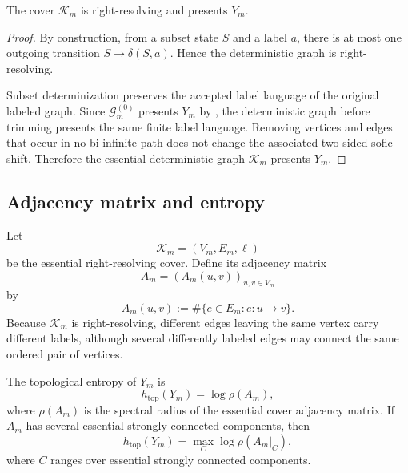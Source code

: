 \begin{proposition}
\label{prop:right-resolving-cover}
The cover \(\mathcal K_m\) is right-resolving and presents \(Y_m\).
\end{proposition}

\begin{proof}
By construction, from a subset state \(S\) and a label \(a\), there is at most one outgoing transition \(S\to\delta(S,a)\).  Hence the deterministic graph is right-resolving.

Subset determinization preserves the accepted label language of the original labeled graph.  Since \(\mathcal G_m^{(0)}\) presents \(Y_m\) by , the deterministic graph before trimming presents the same finite label language.  Removing vertices and edges that occur in no bi-infinite path does not change the associated two-sided sofic shift.  Therefore the essential deterministic graph \(\mathcal K_m\) presents \(Y_m\).
\end{proof}

\subsection{Adjacency matrix and entropy}

Let
\[
\mathcal K_m=(V_m,E_m,\ell)
\]
be the essential right-resolving cover.  Define its adjacency matrix
\[
A_m=(A_m(u,v))_{u,v\in V_m}
\]
by
\[
A_m(u,v):=\#\{e\in E_m:e:u\to v\}.
\]
Because \(\mathcal K_m\) is right-resolving, different edges leaving the same vertex carry different labels, although several differently labeled edges may connect the same ordered pair of vertices.

\begin{theorem}
\label{thm:cover-entropy}
The topological entropy of \(Y_m\) is
\[
h_{\mathrm{top}}(Y_m)=\log\rho(A_m),
\]
where \(\rho(A_m)\) is the spectral radius of the essential cover adjacency matrix.  If \(A_m\) has several essential strongly connected components, then
\[
h_{\mathrm{top}}(Y_m)=\max_C\log\rho(A_m|_C),
\]
where \(C\) ranges over essential strongly connected components.
\end{theorem}


